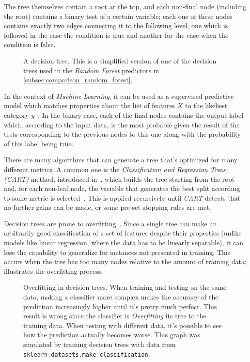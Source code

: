 The tree themselves contain a root at the top, and each non-final node (including the root) contains a binary test of a certain variable; each one of these nodes contains exactly two edges connecting it to the following level, one which is followed in the case the condition is true and another for the case when the condition is false.

\begin{figure}
\centering
{}
\caption{A decision tree. This is a simplified version of one of the decision trees used in the \emph{Random Forest} predictors in \cref{subsec:comparison_random_forest}.}
\label{fig:decision_tree}
\end{figure}

In the context of \emph{Machine Learning}, it can be used as a supervised predictive model which matches properties about the list of features $X$ to the likeliest category $y$~\cite{oded2008decisiontrees}. In the binary case, each of the final nodes contains the output label which, according to the input data, is the most probable given the result of the tests corresponding to the previous nodes to this one along with the probability of this label being true.

There are many algorithms that can generate a tree that's optimized for many different metrics. A common one is the \emph{Classification and Regression Trees (CART)} method, introduced in~\cite{breiman1993classification}, which builds the tree starting from the root and, for each non-leaf node, the variable that generates the best split according to some metric is selected~\cite{loh2011classification}. This is applied recursively until \emph{CART} detects that no further gains can be made, or some pre-set stopping rules are met.

Decision trees are prone to overfitting~\cite{oded2008decisiontrees}. Since a single tree can make an arbitrarily good classification of a set of features despite their properties (unlike models like linear regression, where the data has to be linearly separable), it can lose the capability to generalize for instances not presented in training. This occurs when the tree has too many nodes relative to the amount of training data;  illustrates the overfitting process.

\begin{figure}
\centering
{}
	\caption{Overfitting in decision trees. When training and testing on the same data, making a classifier more complex makes the accuracy of the prediction increasingly higher until it's pretty much perfect. This result is wrong since the classifier is \emph{Overfitting} its tree to the training data. When testing with different data, it's possible to see how the prediction actually becomes worse. This graph was simulated by training decision trees with data from \texttt{sklearn.datasets.make\_classification}\cite{sklearn-make-classification}.}
\label{fig:decisiontreeoverfitting}
\end{figure}

